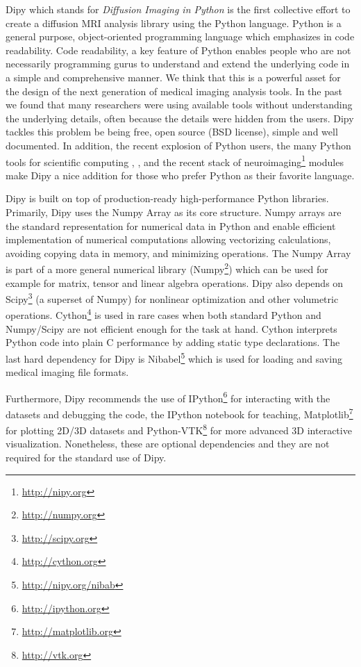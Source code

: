 \documentclass{bioinfo}
\begin{document}
Dipy which stands for \textit{Diffusion Imaging in Python} is the first collective effort to create a diffusion MRI analysis library using the Python language. Python is a general purpose, object-oriented programming language which emphasizes in code readability. Code readability, a key feature of Python enables people who are not necessarily programming gurus to understand and extend the underlying code in a simple and comprehensive manner. We think that this is a powerful asset for the design of the next generation of medical imaging analysis tools. In the past we found that many researchers were using available tools without understanding the underlying details, often because the details were hidden from the users. Dipy tackles this problem be being free, open source (BSD license), simple and well documented. In addition, the recent explosion of Python users, the many Python tools for scientific computing \citep{perez_python:11}, \citep{mckinney_python:12}, \citep{perez_ipython:07} and the recent stack of neuroimaging\footnote{\url{http://nipy.org}} modules make Dipy a nice addition for those who prefer Python as their favorite language.

Dipy is built on top of production-ready high-performance Python libraries. Primarily, Dipy uses the Numpy Array \citep{van_numpy:11} as its core structure. Numpy arrays are the standard representation for numerical data in Python and enable efficient implementation of numerical computations allowing vectorizing calculations, avoiding copying data in memory, and minimizing operations. The Numpy Array is part of a more general numerical library (Numpy\footnote{\url{http://numpy.org}}) which can be used for example for matrix, tensor and linear algebra operations. Dipy also depends on Scipy\footnote{\url{http://scipy.org}} (a superset of Numpy) for nonlinear optimization and other volumetric operations. Cython\footnote{\url{http://cython.org}} is used in rare cases when both standard Python and Numpy/Scipy are not efficient enough for the task at hand. Cython interprets Python code into plain C performance by adding static type declarations. The last hard dependency for Dipy is Nibabel\footnote{\url{http://nipy.org/nibab}} which is used for loading and saving medical imaging file formats.

Furthermore, Dipy recommends the use of IPython\footnote{\url{http://ipython.org}} for interacting with the datasets and debugging the code, the IPython notebook for teaching, Matplotlib\footnote{\url{http://matplotlib.org}} for plotting 2D/3D datasets and Python-VTK\footnote{\url{http://vtk.org}} for more advanced 3D interactive visualization. Nonetheless, these are optional dependencies and they are not required for the standard use of Dipy.
\end{document}
